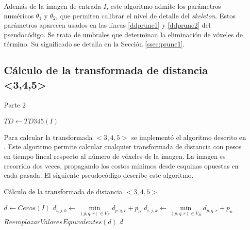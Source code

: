 Además de la imagen de entrada $I$, este algoritmo admite los parámetros numéricos $\theta_{1}$ y $\theta_{2}$, que permiten calibrar el nivel de detalle del \textit{skeleton}. Estos parámetros aparecen usados en las líneas \ref{ddprune1} y \ref{ddprune2} del pseudocódigo. Se trata de umbrales que determinan la eliminación de vóxeles de término. Su significado se detalla en la Sección \ref{ssec:prune1}.

\subsection{Cálculo de la transformada de distancia <3,4,5>}

\begin{algorithm}[H]
\caption{Parte 2}
\begin{algorithmic}[1]
\State $TD \gets TD345(I)$
\end{algorithmic}
\end{algorithm}

Para calcular la transformada $<3,4,5>$ se implementó el algoritmo descrito en \cite{borgefors1996digital}. Este algoritmo permite calcular cualquier transformada de distancia con pesos en tiempo lineal respecto al número de vóxeles de la imagen. La imagen es recorrida dos veces, propagando los costos mínimos desde esquinas opuestas en cada pasada. El siguiente pseudocódigo describe este algoritmo.

\begin{algorithm}[H]
\caption{Cálculo de la transformada de distancia $<3,4,5>$}
\label{alg:ddskel}
\begin{algorithmic}[1]
	\State $d \gets Ceros(I)$
	 
        	\State $d_{i,j,k} \gets \min\limits_{(p,q,r) \in V_F}{d_{p,q,r} + p_n}$
        \EndIf
    \EndFor
    \EndFor
    \EndFor
	 
        	\State $d_{i,j,k} \gets \min\limits_{(p,q,r) \in V_B}{d_{p,q,r} + p_n}$
        \EndIf
    \EndFor
    \EndFor
    \EndFor
    \State $ReemplazarValoresEquivalentes(d)$
    \State \Return $d$
\EndFunction
\end{algorithmic}
\end{algorithm}

